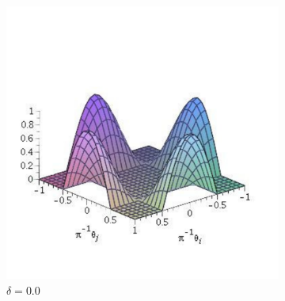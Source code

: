 \begin{figure} 
\caption{ 
    \textbf{Potencial de interação entre os agentes}  para diferentes
    valores de $\delta$ em função de $\theta_i$ e $\theta_j$, onde $h_{i,j}
    = \cos \theta_{i,j}$. 
}
\centering
\begin{subfigure}{.31\textwidth }
\includegraphics[width=\textwidth]{Figures/Vd0}
\caption{ $\delta = 0.0$}
\end{subfigure}
%
\begin{subfigure}{0.31\textwidth }
    \centering

\end{subfigure}
\end{figure}
